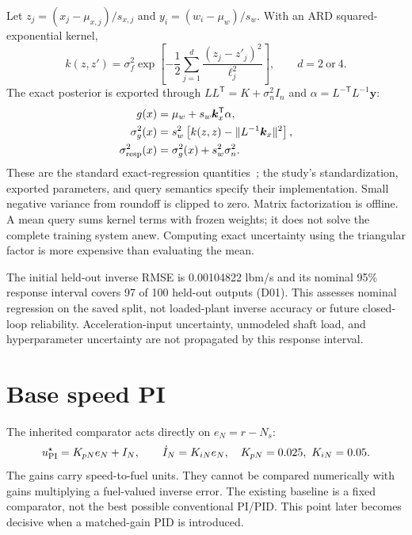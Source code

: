 \documentclass[11pt,a4paper,oneside]{report}
\begin{document}
Let $z_j=(x_j-\mu_{x,j})/s_{x,j}$ and $y_i=(w_i-\mu_w)/s_w$. With an ARD squared-exponential kernel,
\begin{equation}
k(z,z')=\sigma_f^2\exp\!\left[-\frac12\sum_{j=1}^{d}\frac{(z_j-z'_j)^2}{\ell_j^2}\right],\qquad d=2\ \text{or}\ 4.
\end{equation}
The exact posterior is exported through $LL^\mathsf T=K+\sigma_n^2I_n$ and $\alpha=L^{-\mathsf T}L^{-1}\bm y$:
\begin{align}
g(x)&=\mu_w+s_w\bm k_x^\mathsf T\alpha,\\
\sigma_g^2(x)&=s_w^2\left[k(z,z)-\|L^{-1}\bm k_x\|^2\right],\\
\sigma_{\rm resp}^2(x)&=\sigma_g^2(x)+s_w^2\sigma_n^2.
\label{eq:gpvariance}
\end{align}
These are the standard exact-regression quantities~\cite{gpml}; the study's standardization, exported parameters, and query semantics specify their implementation. Small negative variance from roundoff is clipped to zero. Matrix factorization is offline. A mean query sums kernel terms with frozen weights; it does not solve the complete training system anew. Computing exact uncertainty using the triangular factor is more expensive than evaluating the mean.

The initial held-out inverse RMSE is 0.00104822 lbm/s and its nominal 95\% response interval covers 97 of 100 held-out outputs (D01). This assesses nominal regression on the saved split, not loaded-plant inverse accuracy or future closed-loop reliability. Acceleration-input uncertainty, unmodeled shaft load, and hyperparameter uncertainty are not propagated by this response interval.

\section{Base speed PI}
The inherited comparator acts directly on $e_N=r-N_s$:
\begin{equation}
u_{\rm PI}^\star=K_{pN}e_N+I_N,\qquad \dot I_N=K_{iN}e_N,
\quad K_{pN}=0.025,\ K_{iN}=0.05.
\end{equation}
The gains carry speed-to-fuel units. They cannot be compared numerically with gains multiplying a fuel-valued inverse error. The existing baseline is a fixed comparator, not the best possible conventional PI/PID. This point later becomes decisive when a matched-gain PID is introduced.
\end{document}
